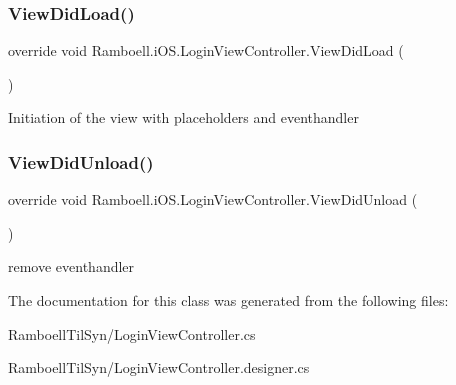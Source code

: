 \subsubsection{\texorpdfstring{View\+Did\+Load()}{ViewDidLoad()}}
{\footnotesize\ttfamily override void Ramboell.\+i\+O\+S.\+Login\+View\+Controller.\+View\+Did\+Load (\begin{DoxyParamCaption}{ }\end{DoxyParamCaption})\hspace{0.3cm}{\ttfamily [inline]}}



Initiation of the view with placeholders and eventhandler 

\mbox{\label{class_ramboell_1_1i_o_s_1_1_login_view_controller_ac6f5b00fbb4861aa7e87e21c25e76c55}} 
\subsubsection{\texorpdfstring{View\+Did\+Unload()}{ViewDidUnload()}}
{\footnotesize\ttfamily override void Ramboell.\+i\+O\+S.\+Login\+View\+Controller.\+View\+Did\+Unload (\begin{DoxyParamCaption}{ }\end{DoxyParamCaption})\hspace{0.3cm}{\ttfamily [inline]}}



remove eventhandler 



The documentation for this class was generated from the following files\+:\begin{DoxyCompactItemize}
\item 
Ramboell\+Til\+Syn/Login\+View\+Controller.\+cs\item 
Ramboell\+Til\+Syn/Login\+View\+Controller.\+designer.\+cs\end{DoxyCompactItemize}
